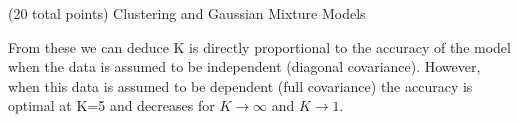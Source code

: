 \documentclass[12pt]{article}
\begin{document}
\begin{question}{(20 total points) Clustering and Gaussian Mixture Models}
\begin{subquestion}
\begin{answerbox}{30em}
{        From these we can deduce K is directly proportional to the accuracy of the model when the data is assumed to be independent (diagonal covariance). However, when this data is assumed to be dependent (full covariance) the accuracy is optimal at K=5 and decreases for $K \to \infty$ and $K \to 1$.
\\ 
\\
\\
\\
        }
      \end{answerbox}
  


   \end{subquestion}

   
\end{question}
\end{document}

